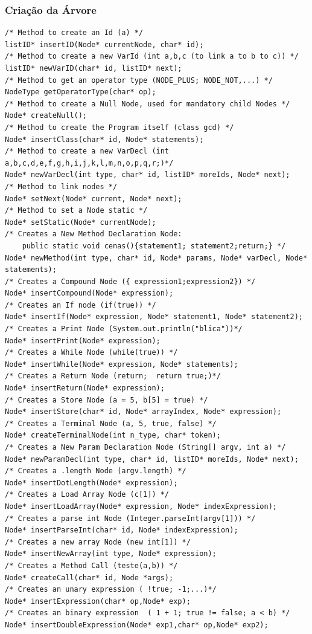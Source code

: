 \documentclass[12pt]{article}
\begin{document}
 \subsubsection{Criação da Árvore}
\begin{lstlisting}
/* Method to create an Id (a) */
listID* insertID(Node* currentNode, char* id);
/* Method to create a new VarId (int a,b,c (to link a to b to c)) */
listID* newVarID(char* id, listID* next);
/* Method to get an operator type (NODE_PLUS; NODE_NOT,...) */
NodeType getOperatorType(char* op);
/* Method to create a Null Node, used for mandatory child Nodes */
Node* createNull();
/* Method to create the Program itself (class gcd) */
Node* insertClass(char* id, Node* statements);
/* Method to create a new VarDecl (int a,b,c,d,e,f,g,h,i,j,k,l,m,n,o,p,q,r;)*/
Node* newVarDecl(int type, char* id, listID* moreIds, Node* next);
/* Method to link nodes */
Node* setNext(Node* current, Node* next);
/* Method to set a Node static */
Node* setStatic(Node* currentNode);
/* Creates a New Method Declaration Node: 
	public static void cenas(){statement1; statement2;return;} */
Node* newMethod(int type, char* id, Node* params, Node* varDecl, Node* statements);
/* Creates a Compound Node ({ expression1;expression2}) */
Node* insertCompound(Node* expression);
/* Creates an If node (if(true)) */
Node* insertIf(Node* expression, Node* statement1, Node* statement2);
/* Creates a Print Node (System.out.println("blica"))*/
Node* insertPrint(Node* expression);
/* Creates a While Node (while(true)) */
Node* insertWhile(Node* expression, Node* statements);
/* Creates a Return Node (return;  return true;)*/
Node* insertReturn(Node* expression);
/* Creates a Store Node (a = 5, b[5] = true) */
Node* insertStore(char* id, Node* arrayIndex, Node* expression);
/* Creates a Terminal Node (a, 5, true, false) */
Node* createTerminalNode(int n_type, char* token);
/* Creates a New Param Declaration Node (String[] argv, int a) */
Node* newParamDecl(int type, char* id, listID* moreIds, Node* next);
/* Creates a .length Node (argv.length) */
Node* insertDotLength(Node* expression);
/* Creates a Load Array Node (c[1]) */
Node* insertLoadArray(Node* expression, Node* indexExpression);
/* Creates a parse int Node (Integer.parseInt(argv[1])) */
Node* insertParseInt(char* id, Node* indexExpression);
/* Creates a new array Node (new int[1]) */
Node* insertNewArray(int type, Node* expression);
/* Creates a Method Call (teste(a,b)) */
Node* createCall(char* id, Node *args);
/* Creates an unary expression ( !true; -1;...)*/
Node* insertExpression(char* op,Node* exp);
/* Creates an binary expression  ( 1 + 1; true != false; a < b) */
Node* insertDoubleExpression(Node* exp1,char* op,Node* exp2);
 \end{lstlisting}
\end{document}
